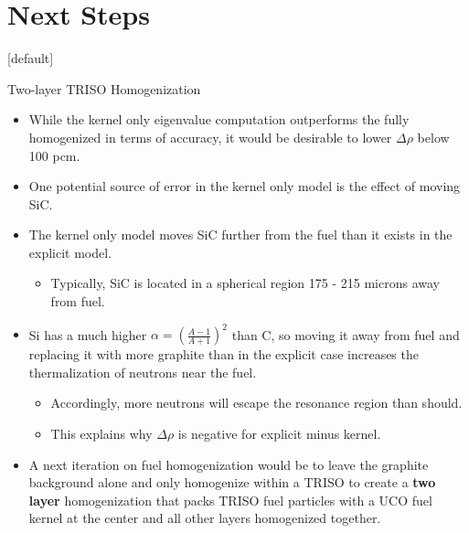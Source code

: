 \documentclass[9pt,t,aspectratio=169]{beamer}
\makeatletter
\newenvironment{withoutheadline}{
       \setbeamertemplate{headline}[default]
       \def\beamer@entrycode{\vspace*{-\headheight}}
    }{}
\makeatother
\begin{document}
\section{Next Steps}
\begin{withoutheadline}
\begin{frame}{Two-layer TRISO Homogenization}
    \pause
    \begin{itemize}
        \item<2-> While the kernel only eigenvalue computation outperforms the fully homogenized in terms of accuracy, it would be desirable to lower $\Delta \rho$ below 100 pcm.
        \item<3-> One potential source of error in the kernel only model is the effect of moving SiC.
        \item<4-> The kernel only model moves SiC further from the fuel than it exists in the explicit model.
        \begin{itemize}
            \item<5-> Typically, SiC is located in a spherical region 175 - 215 microns away from fuel.
        \end{itemize}
        \item<6-> Si has a much higher $\alpha = (\frac{A-1}{A+1})^2$ than C, so moving it away from fuel and replacing it with more graphite than in the explicit case increases the thermalization of neutrons near the fuel.
        \begin{itemize}
            \item<7-> Accordingly, more neutrons will escape the resonance region than should.
            \item<8-> This explains why $\Delta \rho$ is negative for explicit minus kernel.
        \end{itemize}
        \item<9-> A next iteration on fuel homogenization would be to leave the graphite background alone and only homogenize within a TRISO to create a \textbf{two layer} homogenization that packs TRISO fuel particles with a UCO fuel kernel at the center and all other layers homogenized together.
    \end{itemize}
\end{frame}
\end{withoutheadline}

\end{document}
